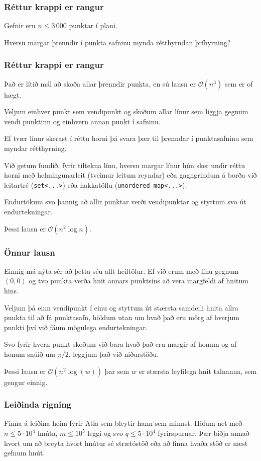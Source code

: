 {
	\frametitle{Réttur krappi er rangur}
	{
		\item<1-> Gefnir eru $n \leq 3\, 000$ punktar í plani.
		\item<2-> Hversu margar þrenndir í punkta safninu mynda rétthyrndan þríhyrning?
	}
}

{
	\frametitle{Réttur krappi er rangur}
	{
		\item<1-> Það er lítið mál að skoða allar þrenndir punkta, en sú lausn er $\mathcal{O}(n^3)$ sem er of hægt.
		\item<2-> Veljum einhver punkt sem vendipunkt og skoðum allar línur sem liggja gegnum vendi punktinn og einhvern annan punkt í safninu.
		\item<3-> Ef tvær línur skerast í réttu horni þá svara þær til þrenndar í punktasafninu sem myndar rétthyrning.
		\item<4-> Við getum fundið, fyrir tiltekna línu, hversu margar línur hún sker undir réttu horni með helmingunarleit (tveimur leitum reyndar)
					eða gagngrindum á borða við leitartré (\texttt{set<...>}) eða hakkatöflu (\texttt{unordered\_map<...>}).
		\item<5-> Endurtökum svo þannig að allir punktar verði vendipunktar og styttum svo út endurtekningar.
		\item<6-> Þessi lausn er $\mathcal{O}(n^2 \log n)$.
	}
}

{
    \frametitle{Önnur lausn}
    {
        \item<1-> Einnig má nýta sér að þetta séu allt heiltölur. Ef við erum með línu gegnum $(0, 0)$ og tvo punkta verða hnit annars punktsins
            að vera margfeldi af hnitum hins. 
        \item<2-> Veljum þá einn vendipunkt í einu og styttum út stærsta samdeili hnita allra punkta til að fá punktasafn, höldum utan um hvað
            það eru mörg af hverjum punkti því við fáum mögulega endurtekningar.
        \item<3-> Svo fyrir hvern punkt skoðum við bara hvað það eru margir af honum og af honum snúið um $\pi/2$, leggjum það við niðurstöðu.
        \item<4-> Þessi lausn er $\mathcal{O}(n^2 \log(w))$ þar sem $w$ er stærsta leyfilega hnit talnanna, sem gengur einnig.
    }
}

{
	\frametitle{Leiðinda rigning}
	{
		\item<1-> Finna á leiðina heim fyrir Atla sem bleytir hann sem minnst. Höfum net með $n \leq 5 \cdot 10^4$ hnúta, $m \leq 10^5$ leggi
            og svo $q \leq 5 \cdot 10^4$ fyrirspurnar. Þær biðja annað hvort um að breyta hvort hnútur sé strætóstöð eða að finna hvaða stöð
            er næst gefnum hnút.
	}
}

